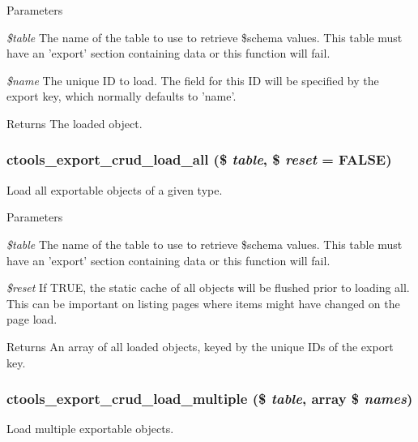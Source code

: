 \begin{DoxyParams}{Parameters}
\item[{\em \$table}]The name of the table to use to retrieve \$schema values. This table must have an 'export' section containing data or this function will fail. \item[{\em \$name}]The unique ID to load. The field for this ID will be specified by the export key, which normally defaults to 'name'.\end{DoxyParams}
\begin{DoxyReturn}{Returns}
The loaded object. 
\end{DoxyReturn}
\hypertarget{group__export__crud_gac25f1e05b48984949bfa0d82e2f6908b}{
\subsubsection[{ctools\_\-export\_\-crud\_\-load\_\-all}]{\setlength{\rightskip}{0pt plus 5cm}ctools\_\-export\_\-crud\_\-load\_\-all (\$ {\em table}, \/  \$ {\em reset} = {\ttfamily FALSE})}}
\label{group__export__crud_gac25f1e05b48984949bfa0d82e2f6908b}
Load all exportable objects of a given type.


\begin{DoxyParams}{Parameters}
\item[{\em \$table}]The name of the table to use to retrieve \$schema values. This table must have an 'export' section containing data or this function will fail. \item[{\em \$reset}]If TRUE, the static cache of all objects will be flushed prior to loading all. This can be important on listing pages where items might have changed on the page load. \end{DoxyParams}
\begin{DoxyReturn}{Returns}
An array of all loaded objects, keyed by the unique IDs of the export key. 
\end{DoxyReturn}
\hypertarget{group__export__crud_ga9394c795ebcc27aa0078668ba1b80102}{
\subsubsection[{ctools\_\-export\_\-crud\_\-load\_\-multiple}]{\setlength{\rightskip}{0pt plus 5cm}ctools\_\-export\_\-crud\_\-load\_\-multiple (\$ {\em table}, \/  array \$ {\em names})}}
\label{group__export__crud_ga9394c795ebcc27aa0078668ba1b80102}
Load multiple exportable objects.


